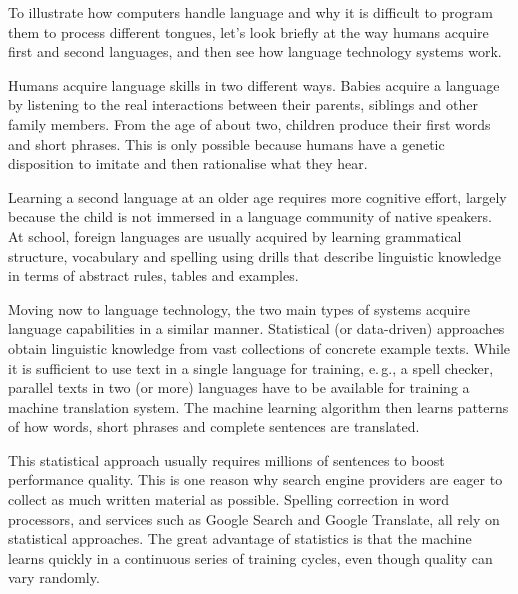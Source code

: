 \begin{multicols}{2}
  To illustrate how computers handle language and why it is difficult to program them to process different tongues, let’s look briefly at the way humans acquire first and second languages, and then see how language technology systems work.

  Humans acquire language skills in two different ways. Babies acquire a language by listening to the real interactions between their parents, siblings and other family members. From the age of about two, children produce their first words and short phrases. This is only possible because humans have a genetic disposition to imitate and then rationalise what they hear. 

  Learning a second language at an older age requires more cognitive effort, largely because the child is not immersed in a language community of native speakers. At school, foreign languages are usually acquired by learning grammatical structure, vocabulary and spelling using drills that describe linguistic knowledge in terms of abstract rules, tables and examples.


  Moving now to language technology, the two main types of systems acquire language capabilities in a similar manner. Statistical (or data-driven) approaches obtain linguistic knowledge from vast collections of concrete example texts. While it is sufficient to use text in a single language for training, e.\,g., a spell checker, parallel texts in two (or more) languages have to be available for training a machine translation system. The machine learning algorithm then learns patterns of how words, short phrases and complete sentences are translated. 

  This statistical approach usually requires millions of sentences to boost performance quality. This is one reason why search engine providers are eager to collect as much written material as possible. Spelling correction in word processors, and services such as Google Search and Google Translate, all rely on statistical approaches. The great advantage of statistics is that the machine learns quickly in a continuous series of training cycles, even though quality can vary randomly.


\end{multicols}
